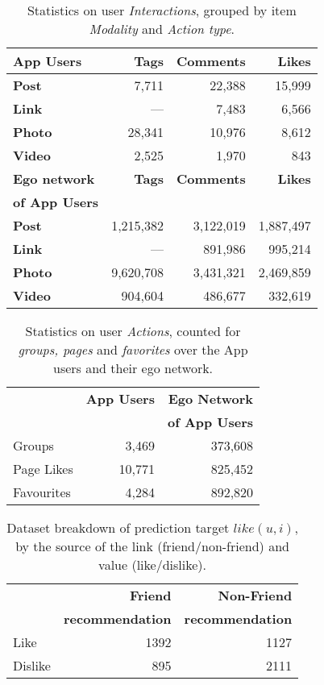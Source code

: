\begin{table}
\centering
\begin{tabular}{|>{\small}l|>{\small}r|>{\small}r|>{\small}r|}
\hline
\textbf{App Users} & \textbf{Tags} & \textbf{Comments} & \textbf{Likes} \\
\hline
\textbf{Post} & 7,711 & 22,388 & 15,999 \\
\hline
\textbf{Link}  & --- & 7,483 & 6,566 \\
\hline
\textbf{Photo} & 28,341 & 10,976 & 8,612 \\
\hline
\textbf{Video} & 2,525 & 1,970 & 843 \\
\hline
\hline
\textbf{Ego network} & \textbf{Tags} & \textbf{Comments} & \textbf{Likes} \\
\textbf{of App Users}  & & & \\
\hline
\textbf{Post} & 1,215,382 & 3,122,019 & 1,887,497 \\
\hline
\textbf{Link} & --- & 891,986 & 995,214 \\
\hline
\textbf{Photo} & 9,620,708 & 3,431,321 & 2,469,859 \\
\hline
\textbf{Video} & 904,604 & 486,677 & 332,619 \\
\hline
\end{tabular}
\caption{Statistics on user {\em Interactions}, grouped by item {\em Modality} and {\em Action type}.}
\label{tab:interactions}
\end{table}


\begin{table}[t!]
\centering
\begin{tabular}{|>{\small}l|>{\small}r|>{\small}r|}
\hline
& \textbf{App Users} & \textbf{Ego Network} \\
& & \textbf{of App Users} \\
\hline
Groups & 3,469 & 373,608 \\
\hline
Page Likes & 10,771 & 825,452 \\
\hline
Favourites & 4,284 & 892,820\\
\hline
\end{tabular}
\caption{Statistics on user {\em Actions}, counted for {\em groups, pages} and {\em favorites} over the App users and their ego network.}
\label{tab:interests}
\end{table}

\begin{table}[t!]
\centering
\begin{tabular}{|>{\small}l|>{\small}r|>{\small}r|}\hline
&\textbf{Friend}  & \textbf{Non-Friend} \\
&\textbf{recommendation}  & \textbf{recommendation} \\
\hline
Like& 1392 & 1127 \\
\hline
Dislike& 895 & 2111\\
\hline
\end{tabular}
\caption{Dataset breakdown of prediction target $like(u,i)$, by the source of the link (friend/non-friend) and value (like/dislike).}
\label{tab:likeinfo}
\end{table}


